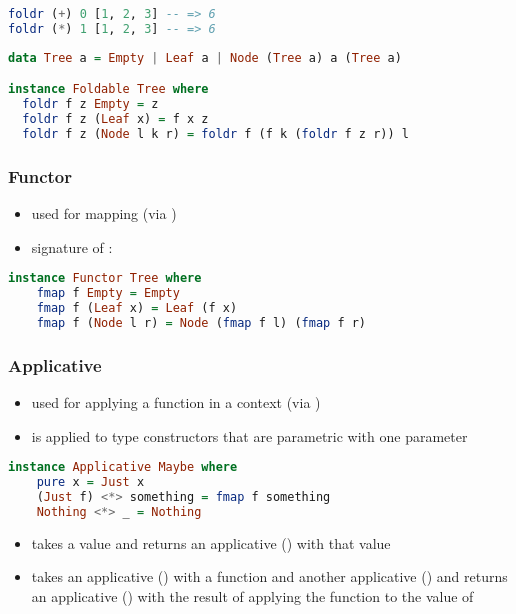 \documentclass[a4paper,landscape,10pt]{article}
\begin{document}
\begin{multicols*}{2}
  \begin{lstlisting}[language=Haskell]
foldr (+) 0 [1, 2, 3] -- => 6
foldr (*) 1 [1, 2, 3] -- => 6
\end{lstlisting}

  \begin{lstlisting}[language=Haskell]
data Tree a = Empty | Leaf a | Node (Tree a) a (Tree a)

instance Foldable Tree where
  foldr f z Empty = z
  foldr f z (Leaf x) = f x z
  foldr f z (Node l k r) = foldr f (f k (foldr f z r)) l
\end{lstlisting}

  \subsubsection{Functor}

  \begin{itemize}
    \item used for mapping (via )
    \item signature of : 
  \end{itemize}

  \begin{lstlisting}[language=Haskell]
instance Functor Tree where
    fmap f Empty = Empty
    fmap f (Leaf x) = Leaf (f x)
    fmap f (Node l r) = Node (fmap f l) (fmap f r)
\end{lstlisting}

  \breakcolumn

  \subsubsection{Applicative}

  \begin{itemize}
    \item used for applying a function in a context (via \ihaskell{<*>})
    \item is applied to type constructors that are parametric with one parameter
  \end{itemize}

  \begin{lstlisting}[language=Haskell]
instance Applicative Maybe where
    pure x = Just x
    (Just f) <*> something = fmap f something
    Nothing <*> _ = Nothing
\end{lstlisting}

  \begin{itemize}
    \item {} takes a value and returns an applicative () with that value
    \item \ihaskell{<*>} takes an applicative () with a function and another applicative () and returns an applicative () with the result of applying the function to the value of 
  \end{itemize}


\end{multicols*}
\end{document}
